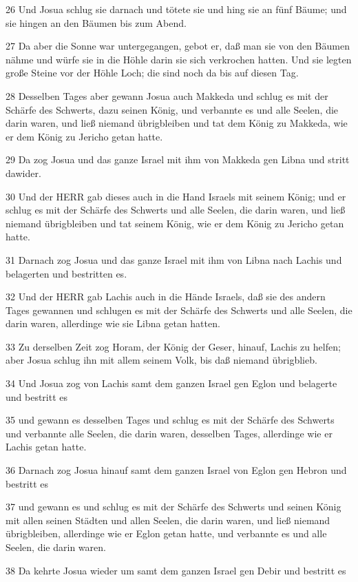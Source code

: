 \par 26 Und Josua schlug sie darnach und tötete sie und hing sie an fünf Bäume; und sie hingen an den Bäumen bis zum Abend.
\par 27 Da aber die Sonne war untergegangen, gebot er, daß man sie von den Bäumen nähme und würfe sie in die Höhle darin sie sich verkrochen hatten. Und sie legten große Steine vor der Höhle Loch; die sind noch da bis auf diesen Tag.
\par 28 Desselben Tages aber gewann Josua auch Makkeda und schlug es mit der Schärfe des Schwerts, dazu seinen König, und verbannte es und alle Seelen, die darin waren, und ließ niemand übrigbleiben und tat dem König zu Makkeda, wie er dem König zu Jericho getan hatte.
\par 29 Da zog Josua und das ganze Israel mit ihm von Makkeda gen Libna und stritt dawider.
\par 30 Und der HERR gab dieses auch in die Hand Israels mit seinem König; und er schlug es mit der Schärfe des Schwerts und alle Seelen, die darin waren, und ließ niemand übrigbleiben und tat seinem König, wie er dem König zu Jericho getan hatte.
\par 31 Darnach zog Josua und das ganze Israel mit ihm von Libna nach Lachis und belagerten und bestritten es.
\par 32 Und der HERR gab Lachis auch in die Hände Israels, daß sie des andern Tages gewannen und schlugen es mit der Schärfe des Schwerts und alle Seelen, die darin waren, allerdinge wie sie Libna getan hatten.
\par 33 Zu derselben Zeit zog Horam, der König der Geser, hinauf, Lachis zu helfen; aber Josua schlug ihn mit allem seinem Volk, bis daß niemand übrigblieb.
\par 34 Und Josua zog von Lachis samt dem ganzen Israel gen Eglon und belagerte und bestritt es
\par 35 und gewann es desselben Tages und schlug es mit der Schärfe des Schwerts und verbannte alle Seelen, die darin waren, desselben Tages, allerdinge wie er Lachis getan hatte.
\par 36 Darnach zog Josua hinauf samt dem ganzen Israel von Eglon gen Hebron und bestritt es
\par 37 und gewann es und schlug es mit der Schärfe des Schwerts und seinen König mit allen seinen Städten und allen Seelen, die darin waren, und ließ niemand übrigbleiben, allerdinge wie er Eglon getan hatte, und verbannte es und alle Seelen, die darin waren.
\par 38 Da kehrte Josua wieder um samt dem ganzen Israel gen Debir und bestritt es
